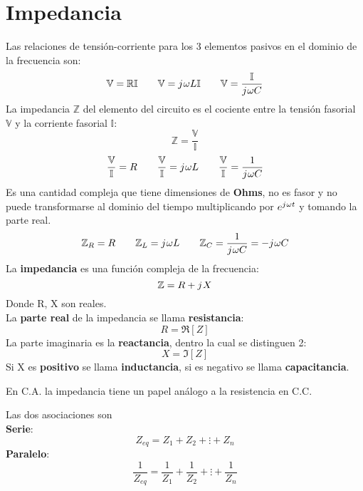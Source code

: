 \documentclass[
	12pt, %
	fleqn, %
	a4paper, %
]{LegrandOrangeBook}
\begin{document}
\section{Impedancia}\label{Impedancia}
Las relaciones de tensión-corriente para los 3 elementos pasivos en el dominio de la frecuencia son:
\begin{equation*}
\mathbb{V}=\mathbb{R}\mathbb{I}
\qquad
\mathbb{V}={j\mkern1mu}\omega L\mathbb{I}
\qquad
\mathbb{V}=\frac{\mathbb{I}}{{j\mkern1mu}\omega C}
\end{equation*}
La impedancia $\mathbb{Z}$ del elemento del circuito es el cociente entre la tensión fasorial $\mathbb{V}$ y la corriente fasorial $\mathbb{I}$:
\begin{displaymath}
\mathbb{Z}=\frac{\mathbb{V}}{\mathbb{I}}
\end{displaymath}
\begin{equation*}
\frac{\mathbb{V}}{\mathbb{I}}=R
\qquad
\frac{\mathbb{V}}{\mathbb{I}}={j\mkern1mu}\omega L
\qquad
\frac{\mathbb{V}}{\mathbb{I}}=\frac{1}{{j\mkern1mu}\omega C}
\end{equation*}
Es una cantidad compleja que tiene dimensiones de \textbf{Ohms}, no es fasor y no puede transformarse al dominio del tiempo multiplicando por $e^{{j\mkern1mu}\omega t}$ y tomando la parte real.
\begin{equation*}
\mathbb{Z}_R=R
\qquad
\mathbb{Z}_L={j\mkern1mu}\omega L
\qquad
\mathbb{Z}_C=\frac{1}{{j\mkern1mu}\omega C}=-{j\mkern1mu}\omega C
\end{equation*}
La \textbf{impedancia} es una función compleja de la frecuencia:
\begin{displaymath}
\mathbb{Z}=R+{j\mkern1mu} X
\end{displaymath}
Donde R, X son reales.\\
La \textbf{parte real} de la impedancia se llama \textbf{resistancia}:
\begin{displaymath}
R=\Re[Z]
\end{displaymath}
La parte imaginaria es la \textbf{reactancia}, dentro la cual se distinguen 2:
\begin{displaymath}
X=\Im[Z]
\end{displaymath}
Si X es \textbf{positivo} se llama \textbf{inductancia}, si es negativo se llama \textbf{capacitancia}.
\begin{remark}
En C.A. la impedancia tiene un papel análogo a la resistencia en C.C.
\end{remark}
\begin{definition}
Las dos asociaciones son\\
\textbf{Serie}:
\begin{equation}
Z_{eq}=Z_1+Z_2+\vdots+Z_n
\label{eq:serie impedancias}
\end{equation}
\textbf{Paralelo}:
\begin{equation}
\frac{1}{Z_{eq}}=\frac{1}{Z_1}+\frac{1}{Z_2}+\vdots+\frac{1}{Z_n}
\end{equation}
\end{definition}
\end{document}
